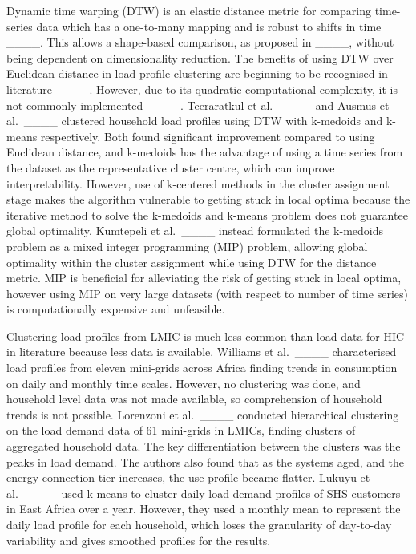 Dynamic time warping (DTW) is an elastic distance metric for comparing time-series data which has a one-to-many mapping and is robust to shifts in time ____. This allows a shape-based comparison, as proposed in ____, without being dependent on dimensionality reduction. The benefits of using DTW over Euclidean distance in load profile clustering are beginning to be recognised in literature ____. However, due to its quadratic computational complexity, it is not commonly implemented ____. Teeraratkul et al.\ ____ and Ausmus et al.\ ____ clustered household load profiles using DTW with k-medoids and k-means respectively. Both found significant improvement compared to using Euclidean distance, and k-medoids has the advantage of using a time series from the dataset as the representative cluster centre, which can improve interpretability. However, use of k-centered methods in the cluster assignment stage makes the algorithm vulnerable to getting stuck in local optima because the iterative method to solve the k-medoids and k-means problem does not guarantee global optimality. Kumtepeli et al.\ ____ instead formulated the k-medoids problem as a mixed integer programming (MIP) problem, allowing global optimality within the cluster assignment while using DTW for the distance metric. MIP is beneficial for alleviating the risk of getting stuck in local optima, however using MIP on very large datasets (with respect to number of time series) is computationally expensive and unfeasible. 

Clustering load profiles from LMIC is much less common than load data for HIC in literature because less data is available. Williams et al.\ ____ characterised load profiles from eleven mini-grids across Africa finding trends in consumption on daily and monthly time scales. However, no clustering was done, and household level data was not made available, so comprehension of household trends is not possible. Lorenzoni et al.\ ____ conducted hierarchical clustering on the load demand data of 61 mini-grids in LMICs, finding clusters of aggregated household data. The key differentiation between the clusters was the peaks in load demand. The authors also found that as the systems aged, and the energy connection tier increases, the use profile became flatter.
Lukuyu et al.\ ____ used k-means to cluster daily load demand profiles of SHS customers in East Africa over a year. However, they used a monthly mean to represent the daily load profile for each household, which loses the granularity of day-to-day variability and gives smoothed profiles for the results.

